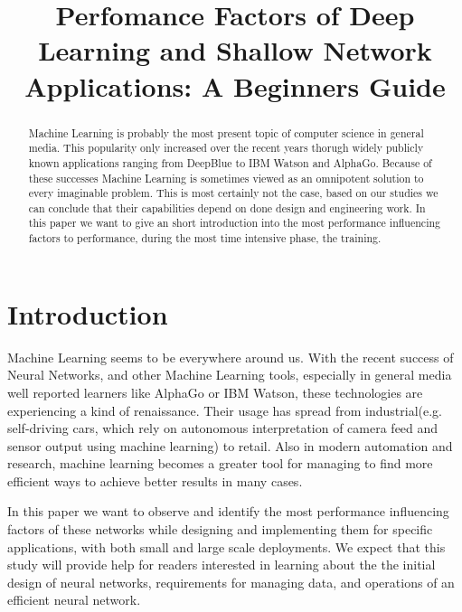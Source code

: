 \documentclass[conference]{IEEEtran}
\begin{document}
\title{
Perfomance Factors of Deep Learning and Shallow Network Applications: A Beginners Guide
}

\author{
}

\maketitle

\begin{abstract}

Machine Learning is probably the most present topic of computer science in general media. This popularity only increased over the recent years thorugh widely publicly known applications ranging from DeepBlue to IBM Watson and AlphaGo. Because of these successes Machine Learning is sometimes viewed as an omnipotent solution to every imaginable problem. This is most certainly not the case, based on our studies we can conclude that their capabilities depend on done design and engineering work. In this paper we want to give an short introduction into the most performance influencing factors to performance, during the most time intensive phase, the training.

\end{abstract}

\IEEEpeerreviewmaketitle
\section{Introduction}
Machine Learning seems to be everywhere around us. With the recent success of Neural Networks, and other Machine Learning tools, especially  in general media well reported learners like AlphaGo or IBM Watson, these technologies are experiencing a kind of renaissance. Their usage has spread from industrial(e.g. self-driving cars, which rely on autonomous interpretation of camera feed and sensor output using machine learning) to retail. Also in modern automation and research, machine learning becomes a greater tool for managing to find more efficient ways to achieve better results in many cases.

In this paper we want to observe and identify the most performance influencing factors of these networks while designing and implementing them for specific applications, with both small and large scale deployments.
We expect that this study will provide help for readers interested in learning about the the initial design of neural networks, requirements for managing data, and operations of an efficient neural network.
\end{document}
